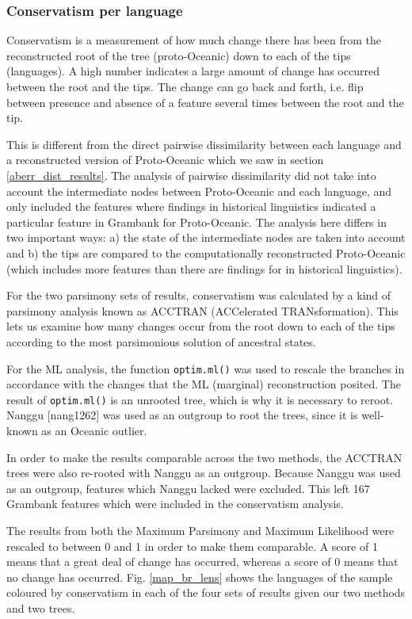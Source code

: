 \documentclass[draft,10pt]{article} %
\begin{document}
\subsubsection{Conservatism per language}
\label{sec:conservatism}
Conservatism is a measurement of how much change there has been from the reconstructed root of the tree (proto-Oceanic) down to each of the tips (languages). A high number indicates a large amount of change has occurred between the root and the tips. The change can go back and forth, i.e. flip between presence and absence of a feature several times between the root and the tip.

This is different from the direct pairwise dissimilarity between each language and a reconstructed version of Proto-Oceanic which we saw in section \ref{aberr_dist_results}. The analysis of pairwise dissimilarity did not take into account the intermediate nodes between Proto-Oceanic and each language, and only included the features where findings in historical linguistics indicated a particular feature in Grambank for Proto-Oceanic. The analysis here differs in two important ways: a) the state of the intermediate nodes are taken into account and b) the tips are compared to the computationally reconstructed Proto-Oceanic (which includes more features than there are findings for in historical linguistics).

For the two parsimony sets of results, conservatism was calculated by a kind of parsimony analysis known as ACCTRAN (ACCelerated TRANsformation). This lets us examine how many changes occur from the root down to each of the tips according to the most parsimonious solution of ancestral states. 

For the ML analysis, the function \texttt{optim.ml()} was used to rescale the branches in accordance with the changes that the ML (marginal) reconstruction posited. The result of \texttt{optim.ml()} is an unrooted tree, which is why it is necessary to reroot. Nanggu [nang1262] was used as an outgroup to root the trees, since it is well-known as an Oceanic outlier.

In order to make the results comparable across the two methods, the ACCTRAN trees were also re-rooted with Nanggu as an outgroup. Because Nanggu was used as an outgroup, features which Nanggu lacked were excluded. This left 167 Grambank features which were included in the conservatism analysis. 

The results from both the Maximum Parsimony and Maximum Likelihood were rescaled to between 0 and 1 in order to make them comparable. A score of 1 means that a great deal of change has occurred, whereas a score of 0 means that no change has occurred. Fig. \ref{map_br_lens} shows the languages of the sample coloured by conservatism in each of the four sets of results given our two methods and two trees.
\end{document}
